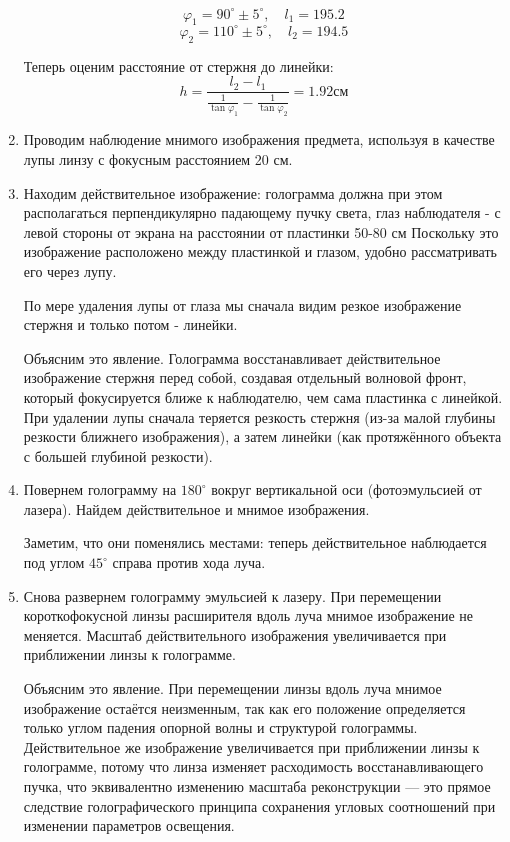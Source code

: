 \documentclass[a4paper,12pt]{article}
\begin{document}
\begin{enumerate}
    $$
    \varphi_1=90^\circ\pm5^\circ, \quad l_1=195.2
    $$
    $$
    \varphi_2=110^\circ\pm5^\circ, \quad l_2=194.5
    $$

    Теперь оценим расстояние от стержня до линейки:
    $$
    h=\frac{l_2-l_1}{\frac{1}{\tan{\varphi_1}}-\frac{1}{\tan{\varphi_2}}}=1.92\text{см}
    $$
    \item Проводим наблюдение мнимого изображения предмета, используя в качестве лупы линзу с фокусным расстоянием 20 см.

    \item Находим действительное изображение: голограмма должна при этом располагаться перпендикулярно падающему пучку света, глаз наблюдателя - с левой стороны от экрана на расстоянии от пластинки 50-80 см Поскольку это изображение расположено между пластинкой и глазом, удобно рассматривать его через лупу.

    По мере удаления лупы от глаза мы сначала видим резкое изображение стержня и только потом - линейки.

    Объясним это явление. Голограмма восстанавливает действительное изображение стержня перед собой, создавая отдельный волновой фронт, который фокусируется ближе к наблюдателю, чем сама пластинка с линейкой. При удалении лупы сначала теряется резкость стержня (из-за малой глубины резкости ближнего изображения), а затем линейки (как протяжённого объекта с большей глубиной резкости).

    \item Повернем голограмму на $180^\circ$ вокруг вертикальной оси (фотоэмульсией от лазера). Найдем действительное и мнимое изображения.

    Заметим, что они поменялись местами: теперь действительное наблюдается под углом $45^\circ$ справа против хода луча.
    \item Снова развернем голограмму эмульсией к лазеру. При перемещении короткофокусной линзы расширителя вдоль луча мнимое изображение не меняется. Масштаб действительного изображения увеличивается при приближении линзы к голограмме.

    Объясним это явление. При перемещении линзы вдоль луча мнимое изображение остаётся неизменным, так как его положение определяется только углом падения опорной волны и структурой голограммы. Действительное же изображение увеличивается при приближении линзы к голограмме, потому что линза изменяет расходимость восстанавливающего пучка, что эквивалентно изменению масштаба реконструкции — это прямое следствие голографического принципа сохранения угловых соотношений при изменении параметров освещения.
\end{enumerate}
\end{document}
